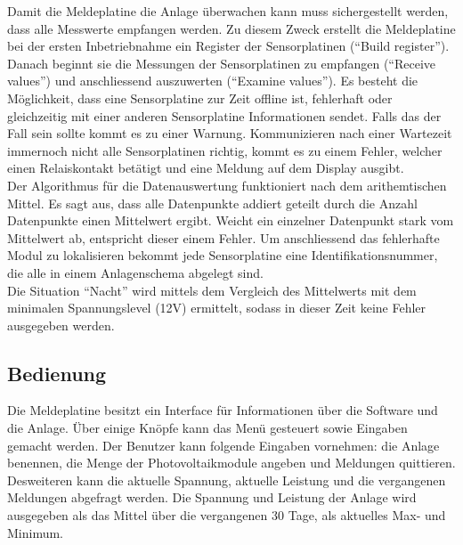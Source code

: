 \newpage

Damit die Meldeplatine die Anlage überwachen kann muss sichergestellt werden, dass alle Messwerte empfangen werden. Zu diesem Zweck erstellt die Meldeplatine bei der ersten Inbetriebnahme ein Register der Sensorplatinen (``Build register''). Danach beginnt sie die Messungen der Sensorplatinen zu empfangen (``Receive values'') und anschliessend auszuwerten (``Examine values''). Es besteht die Möglichkeit, dass eine Sensorplatine zur Zeit offline ist, fehlerhaft oder gleichzeitig mit einer anderen Sensorplatine Informationen sendet. Falls das der Fall sein sollte kommt es zu einer Warnung. Kommunizieren nach einer Wartezeit immernoch nicht alle Sensorplatinen richtig, kommt es zu einem Fehler, welcher einen Relaiskontakt betätigt und eine Meldung auf dem Display ausgibt.\\
Der Algorithmus für die Datenauswertung funktioniert nach dem arithemtischen Mittel. Es sagt aus, dass alle Datenpunkte addiert geteilt durch die Anzahl Datenpunkte einen Mittelwert ergibt. Weicht ein einzelner Datenpunkt stark vom Mittelwert ab, entspricht dieser einem Fehler. Um anschliessend das fehlerhafte Modul zu lokalisieren bekommt jede Sensorplatine eine Identifikationsnummer, die alle in einem Anlagenschema abgelegt sind.\\

Die Situation ``Nacht'' wird mittels dem Vergleich des Mittelwerts mit dem minimalen Spannungslevel (12V) ermittelt, sodass in dieser Zeit keine Fehler ausgegeben werden.




\subsection{Bedienung}
Die Meldeplatine besitzt ein Interface für Informationen über die Software und die Anlage. Über einige  Knöpfe kann das Menü gesteuert sowie Eingaben gemacht werden. Der Benutzer kann folgende Eingaben vornehmen: die Anlage benennen, die Menge der Photovoltaikmodule angeben und Meldungen quittieren. Desweiteren kann die aktuelle Spannung, aktuelle Leistung und die vergangenen Meldungen abgefragt werden. Die Spannung und Leistung der Anlage wird ausgegeben als das Mittel über die vergangenen 30 Tage, als aktuelles Max- und Minimum.
%